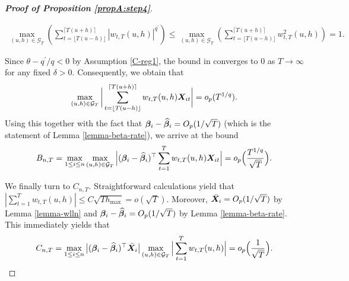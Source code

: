 \documentclass[12pt]{article}
\makeatletter
\renewcommand{\eqref}[1]{\tagform@{\ref{#1}}}
\makeatother
\begin{document}
\begin{proof}[\textnormal{\textbf{Proof of Proposition \ref{propA:step4}}}]
\begin{enumerate}[label=(\roman*),leftmargin=0.85cm]
\begin{align*}
\max_{(u, h) \in \mathcal{G}_T} \left( \sum_{t=\lfloor T(u-h) \rfloor}^{\lceil T(u+h) \rceil} |w_{t,T}(u,h)|^{q^\prime}\right) \leq
\max_{(u, h) \in \mathcal{G}_T} \left( \sum_{t=\lfloor T(u-h) \rfloor}^{\lceil T(u+h) \rceil} w_{t,T}^2(u,h)\right) =1.
\end{align*}
\end{enumerate}
Since $\theta - q^\prime/q <0$ by Assumption \ref{C-reg1}, the bound in \eqref{eq:exp-bound-BnT} converges to $0$ as $T \to \infty$ for any fixed $\delta >0$. Consequently, we obtain that
\begin{align}\label{ineq-diff-9}
\max_{(u, h) \in \mathcal{G}_T} \bigg| \sum_{t=\lfloor T(u-h) \rfloor}^{\lceil T(u+h) \rceil} w_{t,T}(u,h)\boldsymbol{X}_{it}  \bigg| = o_p(T^{1/q}).
\end{align}
Using this together with the fact that $\bm{\beta}_i - \widehat{\bm{\beta}}_i = O_p(1/\sqrt{T})$ (which is the statement of Lemma \ref{lemma-beta-rate}), we arrive at the bound 
\[ B_{n,T} = \max_{1 \le i \le n} \max_{(u,h) \in \mathcal{G}_T} \Big| (\bm{\beta}_i - \widehat{\bm{\beta}}_i)^\top\sum_{t=1}^T w_{t,T}(u,h) \boldsymbol{X}_{it} \Big| = o_p\Big(\frac{T^{1/q}}{\sqrt{T}}\Big). \]


We finally turn to $C_{n,T}$. Straightforward calculations yield that $| \sum_{t=1}^T w_{t,T}(u,h) | \le C \sqrt{T h_{\max}} = o(\sqrt{T})$. 
Moreover, $\bar{\boldsymbol{X}}_i = O_p(1/\sqrt{T})$ by Lemma \ref{lemma-wlln} and $\bm{\beta}_i - \widehat{\bm{\beta}}_i = O_p(1/\sqrt{T})$ by Lemma \ref{lemma-beta-rate}. This immediately yields that
\[ C_{n,T} = \max_{1\le i  \le n}\big|(\bm{\beta}_i - \widehat{\bm{\beta}}_i)^\top\bar{\boldsymbol{X}}_{i}\big| \max_{(u,h) \in \mathcal{G}_T}  \Big| \sum_{t=1}^T w_{t,T}(u,h)  \Big| = o_p\Big(\frac{1}{\sqrt{T}}\Big). \]



\end{proof}
\end{document}
